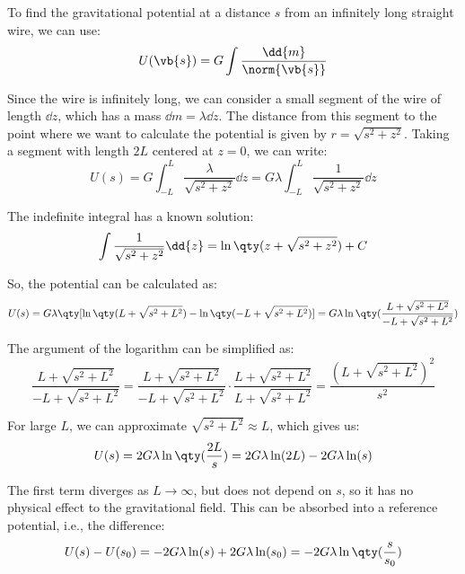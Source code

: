 To find the gravitational potential at a distance $s$ from an infinitely long straight wire, we can use:
\begin{equation*}
    U(\vb{s}) = G \int \frac{\dd{m}}{\norm{\vb{s}}}
\end{equation*}

Since the wire is infinitely long, we can consider a small segment of the wire of length $\dd{z}$, which has a mass $\dd{m} = \lambda \dd{z}$. The distance from this segment to the point where we want to calculate the potential is given by $r = \sqrt{s^{2} + z^{2}}$. Taking a segment with length $2L$ centered at $z=0$, we can write:
\begin{equation*}
    U(s) = G \int_{-L}^{L} \frac{\lambda }{\sqrt{s^{2} + z^{2}}}\dd{z} = G \lambda \int_{-L}^{L} \frac{1}{\sqrt{s^{2} + z^{2}}}\dd{z}
\end{equation*}

The indefinite integral has a known solution:
\begin{equation*}
    \int \frac{1}{\sqrt{s^{2} + z^{2}}}\dd{z} = \ln\qty(z + \sqrt{s^{2} + z^{2}}) + C
\end{equation*}

So, the potential can be calculated as:
\begin{equation*}
    U(s) = G \lambda \qty[ \ln\qty(L + \sqrt{s^{2} + L^{2}}) - \ln\qty(-L + \sqrt{s^{2} + L^{2}}) ] = G \lambda \ln\qty(\frac{L + \sqrt{s^{2} + L^{2}}}{-L + \sqrt{s^{2} + L^{2}}})
\end{equation*}

The argument of the logarithm can be simplified as:
\begin{equation*}
    \frac{L + \sqrt{s^{2} + L^{2}}}{-L + \sqrt{s^{2} + L^{2}}} = \frac{L + \sqrt{s^{2} + L^{2}}}{ - L + \sqrt{s^{2} + L^{2}}} \cdot \frac{L + \sqrt{s^{2} + L^{2}}}{L + \sqrt{s^{2} + L^{2}}} = \frac{(L + \sqrt{s^{2} + L^{2}})^{2}}{s^{2}}
\end{equation*}

For large $L$, we can approximate $\sqrt{s^{2} + L^{2}} \approx L$, which gives us:
\begin{equation*}
    U(s) = 2G\lambda \ln\qty(\dfrac{2L}{s}) = 2G\lambda \ln(2L) - 2G\lambda \ln(s)
\end{equation*}

The first term diverges as $L \to \infty$, but does not depend on $s$, so it has no physical effect to the gravitational field. This can be absorbed into a reference potential, i.e., the difference:
\begin{equation*}
    U(s) - U(s_{0}) = -2G\lambda \ln(s) + 2G\lambda \ln(s_{0}) = -2G\lambda \ln\qty(\frac{s}{s_{0}})
\end{equation*}

